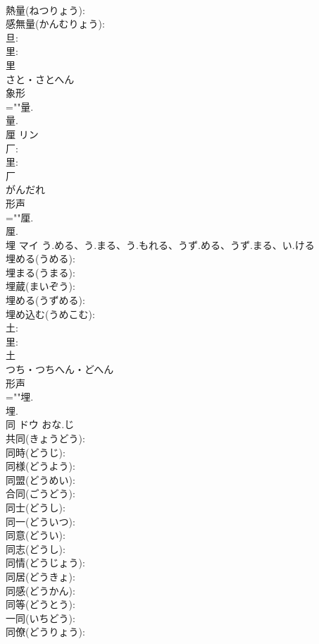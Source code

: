 \documentclass[8pt]{extreport}
\begin{document}
\begin{CJK}{UTF8}{min}
\\	熱量(ねつりょう): 
\\	感無量(かんむりょう): 
\\	旦: 
\\	里: 
\\	里	
\\	さと・さとへん	
\\	象形 
\\	=""量.
\\	量.
\\	厘	リン			
\\	厂: 
\\	里: 
\\	厂	
\\	がんだれ	
\\	形声 
\\	=""厘.
\\	厘.
\\	埋	マイ	う.める、う.まる、う.もれる、うず.める、うず.まる、い.ける		
\\	埋める(うめる): 
\\	埋まる(うまる): 
\\	埋蔵(まいぞう): 
\\	埋める(うずめる): 
\\	埋め込む(うめこむ): 
\\	土: 
\\	里: 
\\	土	
\\	つち・つちへん・どへん	
\\	形声 
\\	=""埋.
\\	埋.
\\	同	ドウ	おな.じ		
\\	共同(きょうどう): 
\\	同時(どうじ): 
\\	同様(どうよう): 
\\	同盟(どうめい): 
\\	合同(ごうどう): 
\\	同士(どうし): 
\\	同一(どういつ): 
\\	同意(どうい): 
\\	同志(どうし): 
\\	同情(どうじょう): 
\\	同居(どうきょ): 
\\	同感(どうかん): 
\\	同等(どうとう): 
\\	一同(いちどう): 
\\	同僚(どうりょう): 

\end{CJK}
\end{document}
